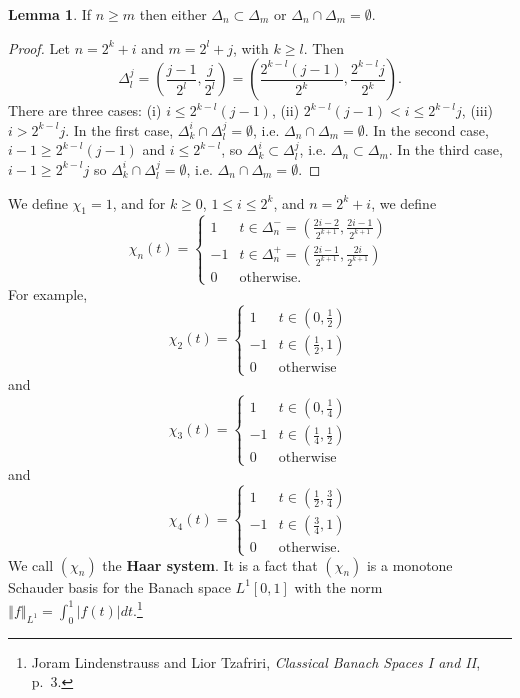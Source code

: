 \documentclass{article}
\newcommand{\norm}[1]{\left\Vert #1 \right\Vert}
\theoremstyle{definition}
\newtheorem{lemma}[theorem]{Lemma}
\theoremstyle{definition}
\begin{document}
\begin{lemma}
If $n \geq m$ then either $\Delta_n \subset \Delta_m$ or $\Delta_n \cap \Delta_m = \emptyset$.
\end{lemma}
\begin{proof}
Let
$n=2^k+i$ and $m=2^l+j$, with $k \geq l$.
Then
\[
\Delta_l^j = \left(\frac{j-1}{2^l},\frac{j}{2^l}\right)
=\left(\frac{2^{k-l}(j-1)}{2^k},\frac{2^{k-l}j}{2^k}\right).
\] 
There are three cases: 
(i) $i \leq 2^{k-l}(j-1)$,
(ii) $2^{k-l}(j-1)<i \leq 2^{k-l}j$,
(iii) $i>2^{k-l}j$. In the first
case, $\Delta_k^i \cap \Delta_l^j = \emptyset$,
i.e. $\Delta_n \cap \Delta_m = \emptyset$. 
 In the second case,
$i-1 \geq 2^{k-l}(j-1)$ and $i \leq 2^{k-l}$, so $\Delta_k^i \subset \Delta_l^j$, i.e.
$\Delta_n \subset \Delta_m$. 
In the third case, $i-1 \geq 2^{k-l}j$ so $\Delta_k^i \cap \Delta_l^j = \emptyset$, i.e. $\Delta_n \cap \Delta_m = \emptyset$. 
\end{proof}

We define $\chi_1=1$,
and for $k \geq 0$,  $1 \leq i \leq 2^k$, and  $n=2^k+i$, we define
\[
\chi_n(t)=\begin{cases}
1&t \in \Delta_n^- =  \left(\frac{2i-2}{2^{k+1}},\frac{2i-1}{2^{k+1}}\right)\\
-1&t \in \Delta_n^+ = \left(\frac{2i-1}{2^{k+1}},  \frac{2i}{2^{k+1}}\right)\\
0&\textrm{otherwise}.
\end{cases}
\]
For example,
\[
\chi_2(t) = 
\begin{cases}
1&t \in \left(0,\frac{1}{2}\right)\\
-1&t \in \left(\frac{1}{2},1\right)\\
0&\textrm{otherwise}
\end{cases}
\]
and
\[
\chi_3(t)
=\begin{cases}
1&t \in \left(0,\frac{1}{4}\right)\\
-1&t \in \left(\frac{1}{4},\frac{1}{2}\right)\\
0&\textrm{otherwise}
\end{cases}
\]
and
\[
\chi_4(t)
=\begin{cases}
1&t \in \left(\frac{1}{2},\frac{3}{4}\right)\\
-1&t \in \left(\frac{3}{4},1\right)\\
0&\textrm{otherwise}.
\end{cases}
\]
We call $(\chi_n)$ the \textbf{Haar system}. It is a fact that $(\chi_n)$ is a monotone Schauder basis for the Banach space
$L^1[0,1]$ with the norm $\norm{f}_{L^1}=\int_0^1 |f(t)| dt$.\footnote{Joram Lindenstrauss and Lior
Tzafriri, {\em Classical Banach Spaces I and II}, p.~3.}
\end{document}
